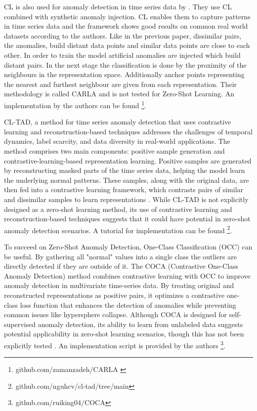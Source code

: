 CL is also used for anomaly detection in time series data by \cite{darban_carla_2024}. They use CL combined with synthetic anomaly injection. CL enables them to capture patterns in time series data and the framework shows good results on common real world datasets according to the authors. Like in the previous paper, dissimilar pairs, the anomalies, build distant data points and similar data points are close to each other. In order to train the model artificial anomalies are injected which build distant pairs. In the next stage the classification is done by  the proximity of the neighbours in the representation space. Additionally anchor points representing the nearest and furthest neighbour are given from each representation. Their methodology is called CARLA and is not tested for Zero-Shot Learning. An implementation by the authors can be found \footnote{\fussy\tiny github.com/zamanzadeh/CARLA \label{foot_carla}}.

CL-TAD, a method for time series anomaly detection that uses contrastive learning and reconstruction-based techniques addresses the challenges of temporal dynamics, label scarcity, and data diversity in real-world applications. The method comprises two main components: positive sample generation and contrastive-learning-based representation learning. Positive samples are generated by reconstructing masked parts of the time series data, helping the model learn the underlying normal patterns. These samples, along with the original data, are then fed into a contrastive learning framework, which contrasts pairs of similar and dissimilar samples to learn representations \cite{ngu_cl-tad_2023}.
While CL-TAD is not explicitly designed as a zero-shot learning method, its use of contrastive learning and reconstruction-based techniques suggests that it could have potential in zero-shot anomaly detection scenarios. A tutorial for implementation can be found \footnote{\fussy\tiny github.com/nguhcv/cl-tad/tree/main}.

To succeed on Zero-Shot Anomaly Detection, One-Class Classification (OCC) can be useful.
By gathering all "normal" values into a single class the outliers are directly detected if they are outside of it.
The COCA (Contrastive One-Class Anomaly Detection) method combines contrastive learning with OCC to improve anomaly detection in multivariate time-series data. By treating original and reconstructed representations as positive pairs, it optimizes a contrastive one-class loss function that enhances the detection of anomalies while preventing common issues like hypersphere collapse. Although COCA is designed for self-supervised anomaly detection, its ability to learn from unlabeled data suggests potential applicability in zero-shot learning scenarios, though this has not been explicitly tested \cite{wang_deep_2023}. An implementation script is provided by the authors \footnote{\fussy\tiny github.com/ruiking04/COCA}.

